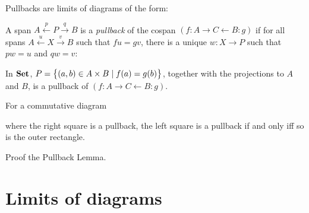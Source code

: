 Pullbacks are limits of diagrams of the form:
\begin{center}
\end{center}
A span $A\stackrel p\longleftarrow P\stackrel q\longrightarrow B$ is a
\emph{pullback} of the cospan $(f:A \to C\leftarrow B: g)$ if for all spans
$A\stackrel u\longleftarrow X\stackrel v\longrightarrow B$ such that $fu=gv$,
there is a unique $w:X \to P$ such that $pw=u$ and $qw=v$:
\begin{center}
\end{center}

\begin{example}
In $\mathbf {Set}$, $P = \big\{ (a, b) \in A \times B \mid f(a) = g(b)  \big\}$,
together with the projections to $A$ and $B$, is a pullback of
$(f:A \to C\leftarrow B: g)$.
\end{example}

\begin{lemma}
For a commutative diagram
\begin{center}
\end{center}
where the right square is a pullback, the left square is a pullback if and
only iff so is the outer rectangle.
\end{lemma}

\begin{exercise}
	Proof the Pullback Lemma.
\end{exercise}


\section{Limits of diagrams}

